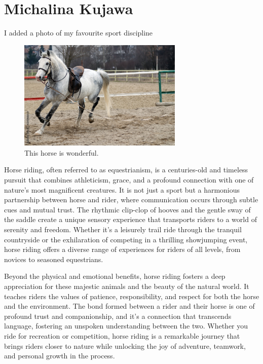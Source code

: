 \section{Michalina Kujawa}
\label{sec:mkujawa}

I added a photo of my favourite sport discipline %

\begin{figure}[H]
    \centering
    \includegraphics[width=0.7\textwidth]{pictures/pic_MK.jpg} 
    \caption{This horse is wonderful.}
    \label{fig:horse}
\end{figure}

Horse riding, often referred to as equestrianism, is a centuries-old and timeless pursuit that combines athleticism, grace, and a profound connection with one of nature's most magnificent creatures. It is not just a sport but a harmonious partnership between horse and rider, where communication occurs through subtle cues and mutual trust. The rhythmic clip-clop of hooves and the gentle sway of the saddle create a unique sensory experience that transports riders to a world of serenity and freedom. Whether it's a leisurely trail ride through the tranquil countryside or the exhilaration of competing in a thrilling showjumping event, horse riding offers a diverse range of experiences for riders of all levels, from novices to seasoned equestrians.

Beyond the physical and emotional benefits, horse riding fosters a deep appreciation for these majestic animals and the beauty of the natural world. It teaches riders the values of patience, responsibility, and respect for both the horse and the environment. The bond formed between a rider and their horse is one of profound trust and companionship, and it's a connection that transcends language, fostering an unspoken understanding between the two. Whether you ride for recreation or competition, horse riding is a remarkable journey that brings riders closer to nature while unlocking the joy of adventure, teamwork, and personal growth in the process.


